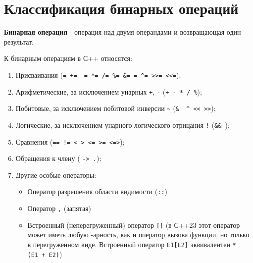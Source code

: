 \section{Классификация бинарных
операций}\label{ux43aux43bux430ux441ux441ux438ux444ux438ux43aux430ux446ux438ux44f-ux431ux438ux43dux430ux440ux43dux44bux445-ux43eux43fux435ux440ux430ux446ux438ux439}

\textbf{Бинарная операция} - операция над двумя операндами и
возвращающая один результат.

К бинарным операциям в С++ относятся:

\begin{enumerate}
\def\labelenumi{\arabic{enumi})}
\tightlist
\item
  Присваивания
  (\texttt{=\ +=\ -=\ *=\ /=\ \%=\ \&=\ \textbar{}=\ \^{}=\ \textgreater{}\textgreater{}=\ \textless{}\textless{}=});
\item
  Арифметические, за исключением унарных \texttt{+}, \texttt{-}
  (\texttt{+\ -\ *\ /\ \%});
\item
  Побитовые, за исключением побитовой инверсии
  \texttt{\textasciitilde{}}
  (\texttt{\&\ \textbar{}\ \^{}\ \textless{}\textless{}\ \textgreater{}\textgreater{}});
\item
  Логические, за исключением унарного логического отрицания \texttt{!}
  (\texttt{\&\&\ \textbar{}\textbar{}});
\item
  Сравнения
  (\texttt{==\ !=\ \textless{}\ \textgreater{}\ \textless{}=\ \textgreater{}=\ \textless{}=\textgreater{}});
\item
  Обращения к члену ( \texttt{-\textgreater{}\ .});
\item
  Другие особые операторы:

  \begin{itemize}
  \tightlist
  \item
    Оператор разрешения области видимости (\texttt{::})
  \item
    Оператор \texttt{,} (запятая)
  \item
    Встроенный (неперегруженный) оператор \texttt{{[}{]}} (в С++23 этот
    оператор может иметь любую -арность, как и оператор вызова функции,
    но только в перегруженном виде. Встроенный оператор
    \texttt{E1{[}E2{]}} эквивалентен \texttt{*(E1\ +\ E2)})
  \end{itemize}
\end{enumerate}
